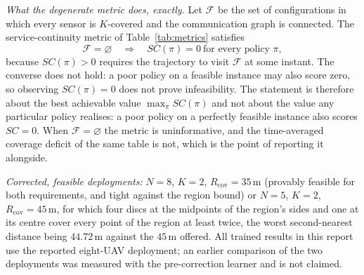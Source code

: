 \documentclass[conference]{IEEEtran}
\newcommand{\tokAltNfiveR}{44.72}
\begin{document}
\emph{What the degenerate metric does, exactly.} Let $\mathcal{F}$ be the
set of configurations in which every sensor is $K$-covered and the
communication graph is connected.  The service-continuity metric of
Table~\ref{tab:metrics} satisfies
\begin{equation}
\mathcal{F}=\varnothing \quad\Longrightarrow\quad SC(\pi)=0\ \text{for every policy }\pi,
\label{eq:scdegenerate}
\end{equation}
because $SC(\pi)>0$ requires the trajectory to visit $\mathcal{F}$ at some
instant.  The converse does not hold: a poor policy on a feasible instance
may also score zero, so observing $SC(\pi)=0$ does not prove infeasibility.
The statement is therefore about the best achievable value
$\max_\pi SC(\pi)$ and not about the value any particular policy realises:
a poor policy on a perfectly feasible instance also scores $SC=0$.  When
$\mathcal{F}=\varnothing$ the metric is uninformative, and the
time-averaged coverage deficit of the same table is not, which is the
point of reporting it alongside.

\emph{Corrected, feasible deployments:} $N=8$, $K=2$, $R_{\mathrm{cov}}=35$\,m
(provably feasible for both requirements, and tight against the region
bound) or $N=5$, $K=2$, $R_{\mathrm{cov}}=45$\,m, for which four discs at
the midpoints of the region's sides and one at its centre cover every point
of the region at least twice, the worst second-nearest distance being
$\tokAltNfiveR$\,m against the $45$\,m offered. All trained results in this
report use the reported eight-UAV deployment; an earlier comparison of the
two deployments was measured with the pre-correction learner and is not
claimed.
\end{document}
